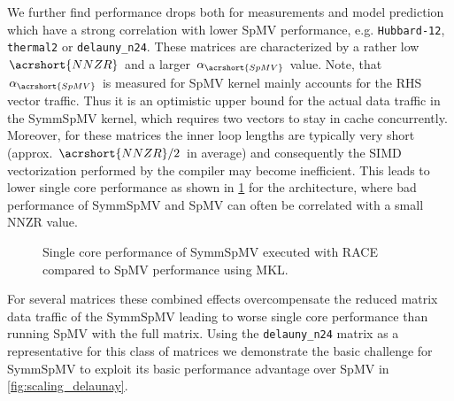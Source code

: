 We further find performance drops both for measurements and model prediction which have a strong correlation with lower \acrshort{SpMV} performance, e.g. \texttt{Hubbard-12}, \texttt{thermal2} or \texttt{delauny\_n24}. These matrices are characterized by a rather low $\acrshort{NNZR}$ and a larger $\alpha_{\acrshort{SpMV}}$ value. Note, that  $\alpha_{\acrshort{SpMV}}$ is measured for \acrshort{SpMV}  kernel mainly accounts for the RHS vector traffic. Thus it is an optimistic upper bound for the actual data traffic in the \acrshort{SymmSpMV} kernel, which requires two vectors to stay in cache concurrently. Moreover, for these matrices the inner loop lengths are typically very short (approx. $\acrshort{NNZR}/2$ in average) and consequently the SIMD vectorization performed by the compiler may become inefficient. This leads to lower single core performance as shown in \cref{fig:SpMV_vs_SymmSpMV_single_core} for the \SKX architecture, where bad performance of \acrshort{SymmSpMV}  and \acrshort{SpMV} can often be correlated with a small \acrshort{NNZR} value. 
%
 \begin{figure}[thbp]
 	\centering
 	\caption{Single core performance of \acrshort{SymmSpMV} executed with \acrshort{RACE} compared to \acrshort{SpMV} performance using \acrshort{MKL}.}
 	\label{fig:SpMV_vs_SymmSpMV_single_core}
 \end{figure}
 For several matrices these combined effects overcompensate the reduced matrix data traffic of the \acrshort{SymmSpMV} leading to worse single core performance than running \acrshort{SpMV} with the full matrix. Using the \texttt{delauny\_n24} matrix as a representative for this class of matrices we demonstrate the basic challenge for \acrshort{SymmSpMV} to exploit its basic performance advantage over \acrshort{SpMV} in \cref{fig:scaling_delaunay}.

